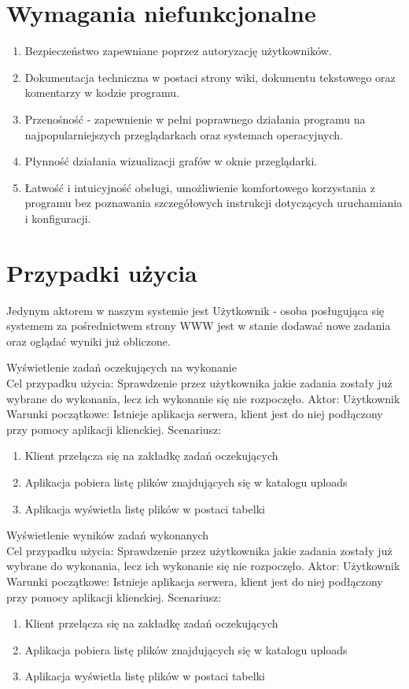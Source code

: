 \section{Wymagania niefunkcjonalne}

\begin{enumerate}
	\item Bezpieczeństwo zapewniane poprzez autoryzację użytkowników.
    \item Dokumentacja techniczna w postaci strony wiki, dokumentu tekstowego oraz komentarzy w kodzie programu.
    \item Przenośność - zapewnienie w pełni poprawnego działania programu na najpopularniejszych przeglądarkach oraz systemach operacyjnych.
    \item Płynność działania wizualizacji grafów w oknie przeglądarki.
    \item Łatwość i intuicyjność obsługi, umożliwienie komfortowego korzystania z programu bez poznawania szczegółowych instrukcji dotyczących uruchamiania i konfiguracji.
\end{enumerate}

\section{Przypadki użycia}

Jedynym aktorem w naszym systemie jest Użytkownik - osoba posługująca się systemem za pośrednictwem strony WWW jest w stanie dodawać nowe zadania oraz oglądać wyniki już obliczone.

	Wyświetlenie zadań oczekujących na wykonanie\\
	Cel przypadku użycia: Sprawdzenie przez użytkownika jakie zadania zostały już wybrane do wykonania, lecz ich wykonanie się nie rozpoczęło. 
	Aktor: Użytkownik
	Warunki początkowe: Istnieje aplikacja serwera, klient jest do niej podłączony przy pomocy aplikacji klienckiej.
	Scenariusz:
	\begin{enumerate}
	\item Klient przełącza się na zakładkę zadań oczekujących
	\item Aplikacja pobiera listę plików znajdujących się w katalogu uploads
	\item  Aplikacja wyświetla listę plików w postaci tabelki
	\end{enumerate}

	Wyświetlenie wyników zadań wykonanych\\
	Cel przypadku użycia: Sprawdzenie przez użytkownika jakie zadania zostały już wybrane do wykonania, lecz ich wykonanie się nie rozpoczęło. 
	Aktor: Użytkownik
	Warunki początkowe: Istnieje aplikacja serwera, klient jest do niej podłączony przy pomocy aplikacji klienckiej.
	Scenariusz:
	\begin{enumerate}
	\item Klient przełącza się na zakładkę zadań oczekujących
	\item Aplikacja pobiera listę plików znajdujących się w katalogu uploads
	\item  Aplikacja wyświetla listę plików w postaci tabelki
	\end{enumerate}

